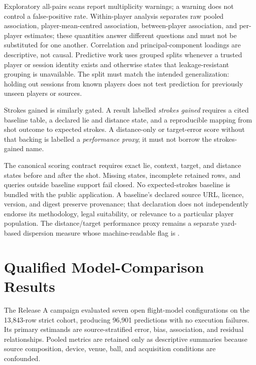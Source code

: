 Exploratory all-pairs scans report multiplicity warnings; a warning does not control a false-positive rate.
Within-player
analysis separates raw pooled association, player-mean-centred association,
between-player association, and per-player estimates; these quantities answer
different questions and must not be substituted for one another. Correlation
and principal-component loadings are descriptive, not causal. Predictive
work uses grouped splits whenever a trusted player or session identity exists
and otherwise states that leakage-resistant grouping is unavailable.
The split must match the intended generalization: holding out sessions from known players does not test prediction for previously unseen players or sources.

Strokes gained is similarly gated. A result labelled \emph{strokes gained}
requires a cited baseline table, a declared lie and distance state, and a
reproducible mapping from shot outcome to expected strokes. A distance-only
or target-error score without that backing is labelled a \emph{performance
proxy}; it must not borrow the strokes-gained name.

The canonical scoring contract requires exact lie, context, target, and distance
states before and after the shot. Missing states, incomplete retained rows, and
queries outside baseline support fail closed. No expected-strokes baseline is bundled
with the public application. A baseline's declared source URL, licence, version,
and digest preserve provenance; that declaration does not independently endorse
its methodology, legal suitability, or relevance to a particular player
population. The distance/target performance proxy remains a separate yard-based
dispersion measure whose machine-readable flag is
.

\section{Qualified Model-Comparison Results}

The Release A campaign evaluated seven open flight-model configurations on the
13,843-row strict cohort, producing 96,901 predictions with no execution
failures. Its primary estimands are source-stratified error, bias, association,
and residual relationships. Pooled metrics are retained only as descriptive
summaries because source composition, device, venue, ball, and acquisition
conditions are confounded.

